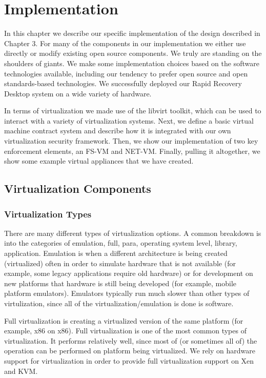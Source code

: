 
\chapter{Implementation}

In this chapter we describe our specific implementation of the design described in Chapter 3. For many of the components in our implementation we either use directly or modify existing open source components. We truly are standing on the shoulders of giants\cite{ben-yehuda_osr_2008}. We make some implementation choices based on the software technologies available, including our tendency to prefer open source and open standards-based technologies. We successfully deployed our Rapid Recovery Desktop system on a wide variety of hardware. 

In terms of virtualization we made use of the libvirt toolkit\cite{libvirt_website}, which can be used to interact with a variety of virtualization systems. Next, we define a basic virtual machine contract system and describe how it is integrated with our own virtualization security framework. Then, we show our implementation of two key enforcement elements, an FS-VM and NET-VM. Finally, pulling it altogether, we show some example virtual appliances that we have created. 

\section{Virtualization Components}

\subsection{Virtualization Types}
There are many different types of virtualization options. A common breakdown is into the categories of emulation, full, para, operating system level, library, application. Emulation is when a different architecture is being created (virtualized) often in order to simulate hardware that is not available (for example, some legacy applications require old hardware) or for development on new platforms that hardware is still being developed (for example, mobile platform emulators). Emulators typically run much slower than other types of virtulization, since all of the virtualization/emulation is done is software.

Full virtualization is creating a virtualized version of the same platform (for example, x86 on x86). Full virtualization is one of the most common types of virtualization. It performs relatively well, since most of (or sometimes all of) the operation can be performed on platform being virtualized. We rely on hardware support for virtualization in order to provide full virtualization support on Xen and KVM.

